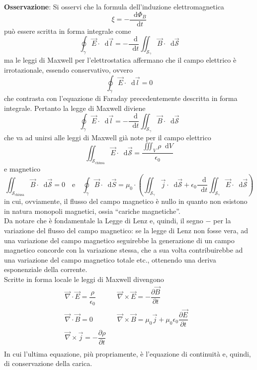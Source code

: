 \documentclass[a4paper]{extarticle}
\newcommand{\quotes}[1]{``#1''}
\newcommand\dif{\mathop{}\!\mathrm{d}}
\begin{document}
\vspace{2em}
\noindent
\textbf{Osservazione}: Si osservi che la formula dell'induzione elettromagnetica
\[\xi=-\dfrac{\dif \Phi_B}{\dif t}\]
può essere scritta in forma integrale come
\[\oint_\gamma \vec E \cdot \dif \vec l = - \dfrac{\dif }{\dif t} \iint_{\mathcal{S}_\gamma} \vec B \cdot \dif \vec{\mathcal{S}}\]
ma le leggi di Maxwell per l'elettrostatica affermano che il campo elettrico è irrotazionale, essendo conservativo, ovvero
\[\oint_\gamma \vec E \cdot \dif \vec l = 0\]
che contrasta con l'equazione di Faraday precedentemente descritta in forma integrale. Pertanto la legge di Maxwell diviene
\[\oint_\gamma \vec E \cdot \dif \vec l = - \dfrac{\dif }{\dif t} \iint_{\mathcal{S}_\gamma} \vec B \cdot \dif \vec{\mathcal{S}}\]
che va ad unirsi alle leggi di Maxwell già note per il campo elettrico
\[\iint_{\mathcal{S}_\text{chiusa}} \vec E \cdot \dif \vec{\mathcal{S}} = \dfrac{\displaystyle{\iiint_V \rho \dif V}}{\epsilon_0}\]
e magnetico
\[\iint_{\mathcal{S}_\text{chiusa}} \vec B \cdot \dif \vec{\mathcal{S}} = 0 \hspace{1em} \text{e} \hspace{1em} \oint_\gamma \vec B \cdot \dif \vec S = \mu_0 \cdot \left(\iint_{\mathcal{S}_\gamma} \vec j \cdot \dif \vec{\mathcal{S}} + \epsilon_0 \dfrac{\dif}{\dif t} \iint_{\mathcal{S}_\gamma} \vec E \cdot \dif \vec{\mathcal{S}}\right)\]
in cui, ovviamente, il flusso del campo magnetico è nullo in quanto non esistono in natura monopoli magnetici, ossia \quotes{cariche magnetiche}.\\
Da notare che è fondamentale la Legge di Lenz e, quindi, il segno $-$ per la variazione del flusso del campo magnetico: se la legge di Lenz non fosse vera, ad una variazione del campo magnetico seguirebbe la generazione di un campo magnetico concorde con la variazione stessa, che a sua volta contribuirebbe ad una variazione del campo magnetico totale etc., ottenendo una deriva esponenziale della corrente.\\
Scritte in forma locale le leggi di Maxwell divengono
\begin{align*}
  &\vec \nabla \cdot \vec E = \dfrac{\rho}{\epsilon_0} && \vec \nabla \times \vec E = - \dfrac{\partial \vec B}{\partial t} &&\\
  &\vec \nabla \cdot \vec B = 0 && \vec \nabla \times \vec B = \mu_0 \vec j + \mu_0 \epsilon_0 \dfrac{\partial \vec E}{\partial t} &&\\
  & \vec \nabla \times \vec j = - \dfrac{\partial \rho}{\partial t}\\
\end{align*}
In cui l'ultima equazione, più propriamente, è l'equazione di continuità e, quindi, di conservazione della carica.
\end{document}
